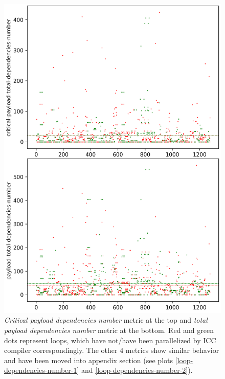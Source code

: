 \begin{figure}[H]
	\centering
	\includegraphics[width=\linewidth]{figs/loop-dependencies-number-0.png}
	\caption{\textit{Critical payload dependencies number} metric at the top and \textit{total payload dependencies number} metric at the bottom. Red and green dots represent loops, which have not/have been parallelized by ICC compiler correspondingly. The other 4 metrics show similar behavior and have been moved into appendix section (see plots \ref{loop-dependencies-number-1} and \ref{loop-dependencies-number-2}).}
	\label{loop-dependencies-number-0}
\end{figure}

